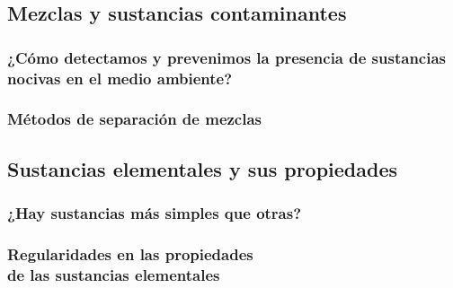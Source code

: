 \documentclass[11pt]{book}
\begin{document}
\newpage \thispagestyle{plain}
\section{Mezclas y sustancias contaminantes}
\subsection{¿Cómo detectamos y prevenimos la presencia de sustancias nocivas en el medio ambiente?}

\subsection{Métodos de separación de mezclas}

\newpage \thispagestyle{plain}
\section{Sustancias elementales y sus propiedades}
\subsection{¿Hay sustancias más simples que otras?}
\subsection{Regularidades en las propiedades\\ de las sustancias elementales}

\newpage
\chapter{}
\newpage \thispagestyle{plain}
\end{document}
